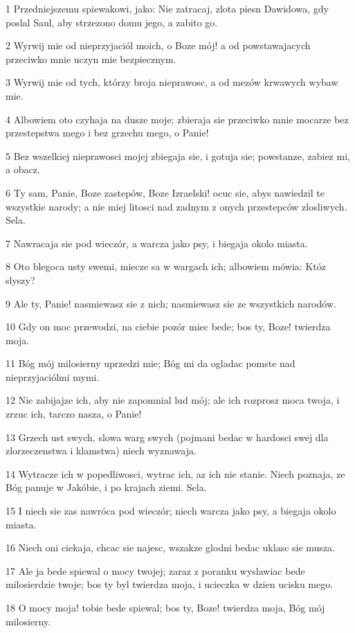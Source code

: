 \par 1 Przedniejszemu spiewakowi, jako: Nie zatracaj, zlota piesn Dawidowa, gdy poslal Saul, aby strzezono domu jego, a zabito go.
\par 2 Wyrwij mie od nieprzyjaciól moich, o Boze mój! a od powstawajacych przeciwko mnie uczyn mie bezpiecznym.
\par 3 Wyrwij mie od tych, którzy broja nieprawosc, a od mezów krwawych wybaw mie.
\par 4 Albowiem oto czyhaja na dusze moje; zbieraja sie przeciwko mnie mocarze bez przestepstwa mego i bez grzechu mego, o Panie!
\par 5 Bez wszelkiej nieprawosci mojej zbiegaja sie, i gotuja sie; powstanze, zabiez mi, a obacz.
\par 6 Ty sam, Panie, Boze zastepów, Boze Izraelski! ocuc sie, abys nawiedzil te wszystkie narody; a nie miej litosci nad zadnym z onych przestepców zlosliwych. Sela.
\par 7 Nawracaja sie pod wieczór, a warcza jako psy, i biegaja okolo miasta.
\par 8 Oto blegoca usty swemi, miecze sa w wargach ich; albowiem mówia: Któz slyszy?
\par 9 Ale ty, Panie! nasmiewasz sie z nich; nasmiewasz sie ze wszystkich narodów.
\par 10 Gdy on moc przewodzi, na ciebie pozór miec bede; bos ty, Boze! twierdza moja.
\par 11 Bóg mój milosierny uprzedzi mie; Bóg mi da ogladac pomste nad nieprzyjaciólmi mymi.
\par 12 Nie zabijajze ich, aby nie zapomnial lud mój; ale ich rozprosz moca twoja, i zrzuc ich, tarczo nasza, o Panie!
\par 13 Grzech ust swych, slowa warg swych (pojmani bedac w hardosci swej dla zlorzeczenstwa i klamstwa) niech wyznawaja.
\par 14 Wytracze ich w popedliwosci, wytrac ich, az ich nie stanie. Niech poznaja, ze Bóg panuje w Jakóbie, i po krajach ziemi. Sela.
\par 15 I niech sie zas nawróca pod wieczór; niech warcza jako psy, a biegaja okolo miasta.
\par 16 Niech oni ciekaja, chcac sie najesc, wszakze glodni bedac uklasc sie musza.
\par 17 Ale ja bede spiewal o mocy twojej; zaraz z poranku wyslawiac bede milosierdzie twoje; bos ty byl twierdza moja, i ucieczka w dzien ucisku mego.
\par 18 O mocy moja! tobie bede spiewal; bos ty, Boze! twierdza moja, Bóg mój milosierny.

